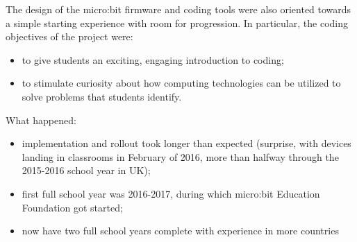 The design of the micro:bit firmware and coding tools were also oriented towards a 
simple starting experience with room for progression. In particular, the coding 
objectives of the project were:
\begin{itemize}
  \item to give students an exciting, engaging introduction to coding;
  \item to stimulate curiosity about how computing technologies can be utilized 
  to solve problems that students identify. 
\end{itemize}

%

What happened:
\begin{itemize}
\item implementation and rollout took longer than expected (surprise, with devices landing
in classrooms in February of 2016, more than halfway through the 2015-2016 school year in UK);
\item first full school year was 2016-2017, during which micro:bit Education Foundation got
started; 
\item now have two full school years complete with experience in more countries 
\end{itemize}





 
